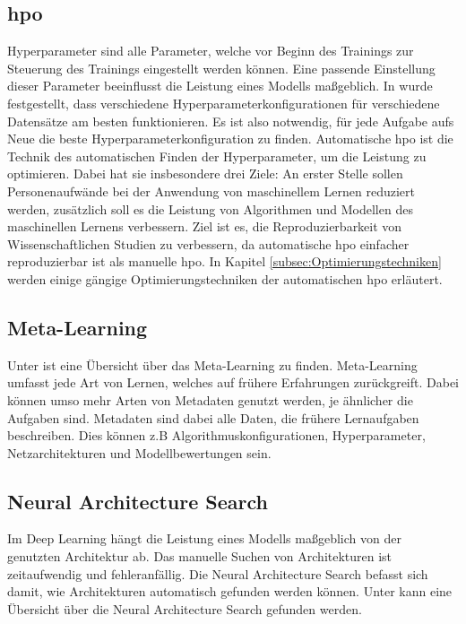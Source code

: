 	\subsection{\acl{hpo}}
	\label{subsec:HyperparameterOptimierung}	
	Hyperparameter sind alle Parameter, welche vor Beginn des Trainings zur Steuerung des Trainings eingestellt werden können. Eine passende Einstellung dieser Parameter beeinflusst die Leistung eines Modells maßgeblich. In \cite{Kohavi.1995} wurde festgestellt, dass verschiedene Hyperparameterkonfigurationen für verschiedene Datensätze am besten funktionieren. Es ist also notwendig, für jede Aufgabe aufs Neue die beste Hyperparameterkonfiguration zu finden.      Automatische \ac{hpo} ist die Technik des automatischen Finden der Hyperparameter, um die Leistung zu optimieren. Dabei hat sie insbesondere drei Ziele: An erster Stelle sollen Personenaufwände bei der Anwendung von maschinellem Lernen reduziert werden, zusätzlich soll es die Leistung von Algorithmen und Modellen des maschinellen Lernens verbessern. Ziel ist es, die Reproduzierbarkeit von Wissenschaftlichen Studien zu verbessern, da automatische \ac{hpo} einfacher reproduzierbar ist als manuelle \ac{hpo}. In Kapitel \ref{subsec:Optimierungstechniken} werden einige gängige Optimierungstechniken der automatischen \ac{hpo} erläutert.  
	\cite{Feurer.2019}		
		
	\subsection{Meta-Learning}
	\label{subsec:MetaLearning}
	Unter \cite{JoaquinVanschoren.2018} ist eine Übersicht über das Meta-Learning zu finden. Meta-Learning umfasst jede Art von Lernen, welches auf frühere Erfahrungen zurückgreift. Dabei können umso mehr Arten von Metadaten genutzt werden, je ähnlicher die Aufgaben sind. Metadaten sind dabei alle Daten, die frühere Lernaufgaben beschreiben. Dies können z.B Algorithmuskonfigurationen, Hyperparameter, Netzarchitekturen und Modellbewertungen sein.
	
	\subsection{Neural Architecture Search}
	\label{subsec:NeuralArchitectureSearch}
	Im Deep Learning hängt die Leistung eines Modells maßgeblich von der genutzten Architektur ab. Das manuelle Suchen von Architekturen ist zeitaufwendig und fehleranfällig. Die Neural Architecture Search befasst sich damit, wie Architekturen automatisch gefunden werden können. Unter \cite{Elsken.2019} kann eine Übersicht über die Neural Architecture Search gefunden werden. 	

